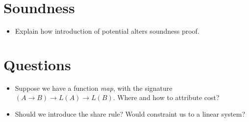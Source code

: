 \section{Soundness}
\begin{itemize}
   \item Explain how introduction of potential alters soundness proof.
\end{itemize}

\section{Questions}

\begin{itemize}
   \item Suppose we have a function \emph{map}, with the signature \((A \to B) \to L(A) \to L(B)\). Where and how to attribute cost?
   \item Should we introduce the share rule? Would constraint us to a linear system?
\end{itemize}

